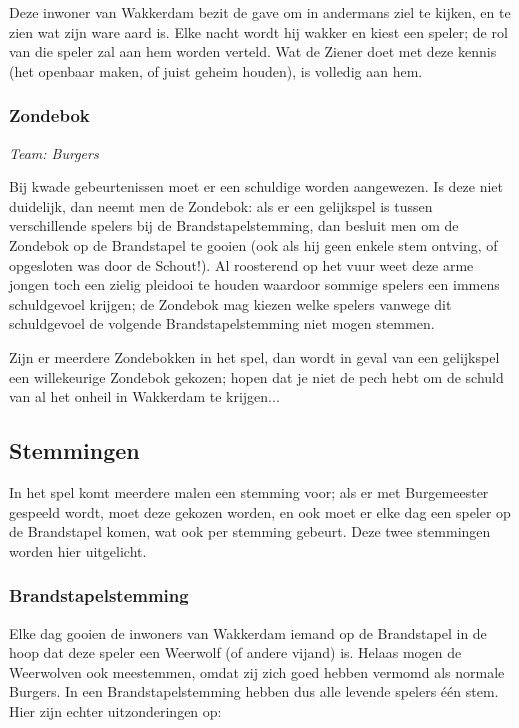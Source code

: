 \documentclass[12pt]{article}
\begin{document}
      Deze inwoner van Wakkerdam bezit de gave om in andermans ziel te kijken, en te zien wat zijn ware aard is. Elke nacht wordt hij wakker en kiest een speler; de rol van die speler zal aan hem worden verteld. Wat de Ziener doet met deze kennis (het openbaar maken, of juist geheim houden), is volledig aan hem.

    \subsubsection{Zondebok}
      \emph{\scriptsize Team: Burgers}
    
      Bij kwade gebeurtenissen moet er een schuldige worden aangewezen. Is deze niet duidelijk, dan neemt men de Zondebok: als er een gelijkspel is tussen verschillende spelers bij de Brandstapelstemming, dan besluit men om de Zondebok op de Brandstapel te gooien (ook als hij geen enkele stem ontving, of opgesloten was door de Schout!). Al roosterend op het vuur weet deze arme jongen toch een zielig pleidooi te houden waardoor sommige spelers een immens schuldgevoel krijgen; de Zondebok mag kiezen welke spelers vanwege dit schuldgevoel de volgende Brandstapelstemming niet mogen stemmen.
    
      Zijn er meerdere Zondebokken in het spel, dan wordt in geval van een gelijkspel een willekeurige Zondebok gekozen; hopen dat je niet de pech hebt om de schuld van al het onheil in Wakkerdam te krijgen...
    
  \subsection{Stemmingen}
  
    In het spel komt meerdere malen een stemming voor; als er met Burgemeester gespeeld wordt, moet deze gekozen worden, en ook moet er elke dag een speler op de Brandstapel komen, wat ook per stemming gebeurt. Deze twee stemmingen worden hier uitgelicht.
    
    \subsubsection{Brandstapelstemming}
  
      Elke dag gooien de inwoners van Wakkerdam iemand op de Brandstapel in de hoop dat deze speler een Weerwolf (of andere vijand) is. Helaas mogen de Weerwolven ook meestemmen, omdat zij zich goed hebben vermomd als normale Burgers. In een Brandstapelstemming hebben dus alle levende spelers \'e\'en stem. Hier zijn echter uitzonderingen op:
      
\end{document}
